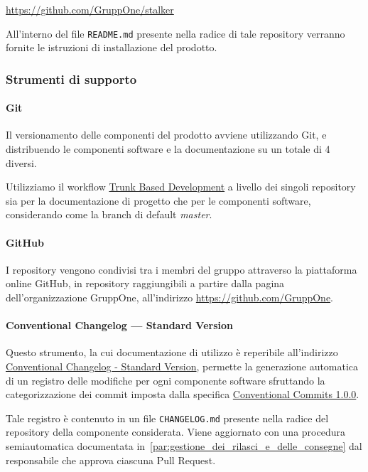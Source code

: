 \documentclass[../../norme-di-progetto.tex]{subfiles}
\begin{document}
\begin{center}
  \href{https://github.com/GruppOne/stalker}{https://github.com/GruppOne/stalker}
\end{center}

All'interno del file \verb|README.md| presente nella radice di tale repository verranno fornite le istruzioni di installazione del prodotto.


\subsubsection{Strumenti di supporto}%
\label{subs:gestione_della_configurazione/strumenti_di_supporto}

\paragraph{Git}%
\label{par:git}

Il versionamento delle componenti del prodotto avviene utilizzando Git, e distribuendo le componenti software e la documentazione su un totale di 4  diversi.

Utilizziamo il workflow \href{https://trunkbaseddevelopment.com/}{Trunk Based Development} a livello dei singoli repository sia per la documentazione di progetto che per le componenti software, considerando come  la branch di default \textit{master}.


\paragraph{GitHub}%
\label{par:github}

I repository vengono condivisi tra i membri del gruppo attraverso la piattaforma online GitHub, in repository raggiungibili a partire dalla pagina dell'organizzazione GruppOne, all'indirizzo \href{https://github.com/GruppOne}{https://github.com/GruppOne}.


\paragraph{Conventional Changelog --- Standard Version}%
\label{par:conventional_changelog_standard_version}

Questo strumento, la cui documentazione di utilizzo è reperibile all'indirizzo \href{https://github.com/conventional-changelog/standard-version/blob/master/README.md}{Conventional Changelog - Standard Version}, permette la generazione automatica di un registro delle modifiche per ogni componente software sfruttando la categorizzazione dei commit imposta dalla specifica \href{https://www.conventionalcommits.org/en/v1.0.0/}{Conventional Commits 1.0.0}.

Tale registro è contenuto in un file \verb|CHANGELOG.md| presente nella radice del repository della componente considerata.
Viene aggiornato con una procedura semiautomatica documentata in~\ref{par:gestione_dei_rilasci_e_delle_consegne} dal responsabile che approva ciascuna Pull Request.

\end{document}
